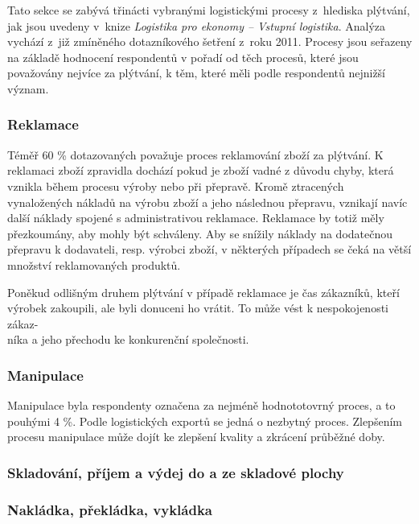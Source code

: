 Tato sekce se zabývá třinácti vybranými logistickými procesy z~hlediska plýtvání, jak jsou uvedeny v~knize \emph{Logistika pro ekonomy -- Vstupní logistika}\cite{bib:Jirsak}. Analýza vychází z~již zmíněného dotazníkového šetření z~roku 2011. Procesy jsou seřazeny na základě hodnocení respondentů v pořadí od těch procesů, které jsou považovány nejvíce za plýtvání, k těm, které měli podle respondentů nejnižší význam.

\subsubsection*{Reklamace}

Téměř 60 \% dotazovaných považuje proces reklamování zboží za plýtvání. K reklamaci zboží zpravidla dochází pokud je zboží vadné z důvodu chyby, která vznikla během procesu výroby nebo při přepravě. Kromě ztracených vynaložených nákladů na výrobu zboží a jeho následnou přepravu, vznikají navíc další náklady spojené s administrativou reklamace. Reklamace by totiž měly přezkoumány, aby mohly být schváleny. Aby se snížily náklady na dodatečnou přepravu k dodavateli, resp. výrobci zboží, v některých případech se čeká na větší množství reklamovaných produktů.\cite{bib:Jirsak}

Poněkud odlišným druhem plýtvání v případě reklamace je čas zákazníků, kteří výrobek zakoupili, ale byli donuceni ho vrátit. To může vést k nespokojenosti zákaz-\\níka a jeho přechodu ke konkurenční společnosti.\cite{bib:Jirsak}

\subsubsection*{Manipulace}

Manipulace byla respondenty označena za nejméně hodnototovrný proces, a to pouhými 4 \%. Podle logistických exportů se jedná o nezbytný proces. Zlepšením procesu manipulace může dojít ke zlepšení kvality a zkrácení průběžné doby.

\subsubsection*{Skladování, příjem a výdej do a ze skladové plochy}

\subsubsection*{Nakládka, překládka, vykládka}

